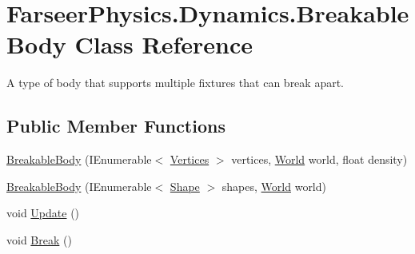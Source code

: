 \hypertarget{class_farseer_physics_1_1_dynamics_1_1_breakable_body}{\section{Farseer\+Physics.\+Dynamics.\+Breakable\+Body Class Reference}
\label{class_farseer_physics_1_1_dynamics_1_1_breakable_body}
}


A type of body that supports multiple fixtures that can break apart.  


\subsection*{Public Member Functions}
\begin{DoxyCompactItemize}
\item 
\hyperlink{class_farseer_physics_1_1_dynamics_1_1_breakable_body_a5c8de6dc920c5bd2ab23b282673cbebd}{Breakable\+Body} (I\+Enumerable$<$ \hyperlink{class_farseer_physics_1_1_common_1_1_vertices}{Vertices} $>$ vertices, \hyperlink{class_farseer_physics_1_1_dynamics_1_1_world}{World} world, float density)
\item 
\hyperlink{class_farseer_physics_1_1_dynamics_1_1_breakable_body_a5f5fe7d2e354b075aea4f8f3f2104271}{Breakable\+Body} (I\+Enumerable$<$ \hyperlink{class_farseer_physics_1_1_collision_1_1_shapes_1_1_shape}{Shape} $>$ shapes, \hyperlink{class_farseer_physics_1_1_dynamics_1_1_world}{World} world)
\item 
void \hyperlink{class_farseer_physics_1_1_dynamics_1_1_breakable_body_af20d64400d38f09cd56f5dd2bc872391}{Update} ()
\item 
void \hyperlink{class_farseer_physics_1_1_dynamics_1_1_breakable_body_abcf35f64152998467c8d387a4e0702fa}{Break} ()
\end{DoxyCompactItemize}
